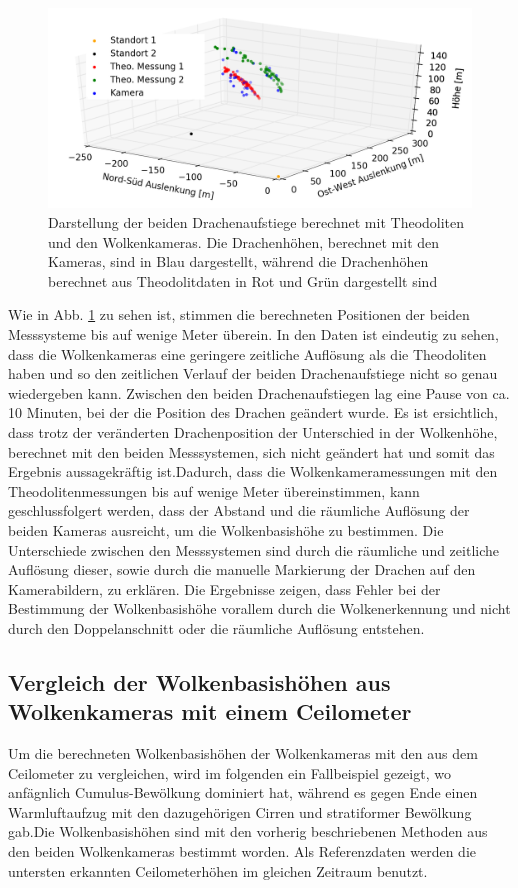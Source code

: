 \documentclass[a4paper,11pt,twoside,german]{article}
\newcommand{\absatz}{\smallbreak}
\begin{document}
\begin{figure}[h]
	\begin{center}
		\includegraphics[width=1\textwidth]{media/dragon_theo.png}
		\caption[Drachenaufstieg]{Darstellung der beiden Drachenaufstiege berechnet mit Theodoliten und den Wolkenkameras.  Die Drachenhöhen, berechnet mit den Kameras, sind in Blau dargestellt, während die Drachenhöhen berechnet aus Theodolitdaten in Rot und Grün dargestellt sind}
		\label{FIGTheoDragon}
	\end{center}
\end{figure}
Wie in Abb. \ref{FIGTheoDragon} zu sehen ist, stimmen die berechneten Positionen
der beiden Messsysteme bis auf wenige Meter überein. In den Daten ist eindeutig
zu sehen, dass die Wolkenkameras eine geringere zeitliche Auflösung als die
Theodoliten haben und so den zeitlichen Verlauf der beiden Drachenaufstiege
nicht so genau wiedergeben kann. Zwischen den beiden Drachenaufstiegen lag eine
Pause von ca. 10 Minuten, bei der die Position des Drachen geändert wurde. Es
ist ersichtlich, dass trotz der veränderten Drachenposition der Unterschied in
der Wolkenhöhe, berechnet mit den beiden Messsystemen, sich nicht geändert hat
und somit das Ergebnis aussagekräftig ist.\absatz Dadurch, dass die
Wolkenkameramessungen mit den Theodolitenmessungen bis auf wenige Meter
übereinstimmen, kann geschlussfolgert werden, dass der Abstand und die räumliche
Auflösung der beiden Kameras ausreicht, um die Wolkenbasishöhe zu bestimmen. Die
Unterschiede zwischen den Messsystemen sind durch die räumliche und zeitliche
Auflösung dieser, sowie durch die manuelle Markierung der Drachen auf den
Kamerabildern, zu erklären. Die Ergebnisse zeigen, dass Fehler bei der
Bestimmung der Wolkenbasishöhe vorallem durch die Wolkenerkennung und nicht
durch den Doppelanschnitt oder die räumliche Auflösung entstehen.

\subsection{Vergleich der Wolkenbasishöhen aus Wolkenkameras mit einem Ceilometer}
\label{SECCeilo}
Um die berechneten Wolkenbasishöhen der Wolkenkameras mit den aus dem Ceilometer
zu vergleichen, wird im folgenden ein Fallbeispiel gezeigt, wo anfägnlich
Cumulus-Bewölkung dominiert hat, während es gegen Ende einen Warmluftaufzug mit
den dazugehörigen Cirren und stratiformer Bewölkung gab.\absatz Die
Wolkenbasishöhen sind mit den vorherig beschriebenen Methoden aus den beiden
Wolkenkameras bestimmt worden. Als Referenzdaten werden die untersten erkannten
Ceilometerhöhen im gleichen Zeitraum benutzt.\absatz
\end{document}

